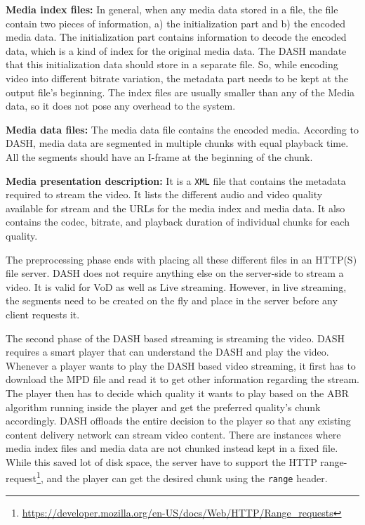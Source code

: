 {\bf Media index files:} In general, when any media data stored in a file, the file contain two pieces of information, a) the initialization part and b) the encoded media data. The initialization part contains information to decode the encoded data, which is a kind of index for the original media data. The DASH mandate that this initialization data should store in a separate file. So, while encoding video into different bitrate variation, the metadata part needs to be kept at the output file's beginning. The index files are usually smaller than any of the Media data, so it does not pose any overhead to the system.

{\bf Media data files:} The media data file contains the encoded media. According to DASH, media data are segmented in multiple chunks with equal playback time. All the segments should have an I-frame  at the beginning of the chunk.

{\bf Media presentation description:} It is a {\tt XML} file that contains the metadata required to stream the video. It lists the different audio and video quality available for stream and the URLs for the media index and media data. It also contains the codec, bitrate, and playback duration of individual chunks for each quality.

The preprocessing phase ends with placing all these different files in an HTTP(S) file server. DASH does not require anything else on the server-side to stream a video. It is valid for VoD as well as Live streaming. However, in live streaming, the segments need to be created on the fly and place in the server before any client requests it.

The second phase of the DASH based streaming is streaming the video. DASH requires a smart player that can understand the DASH and play the video. Whenever a player wants to play the DASH based video streaming, it first has to download the MPD file and read it to get other information regarding the stream. The player then has to decide which quality it wants to play based on the ABR algorithm running inside the player and get the preferred quality's chunk accordingly. DASH offloads the entire decision to the player so that any existing content delivery network can stream video content. There are instances where media index files and media data are not chunked instead kept in a fixed file. While this saved lot of disk space, the server have to support the HTTP range-request\footnote{\url{https://developer.mozilla.org/en-US/docs/Web/HTTP/Range_requests}}, and the player can get the desired chunk using the {\tt range} header.

